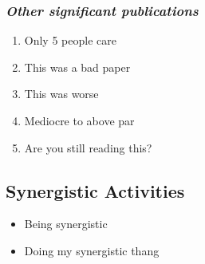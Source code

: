 \subsubsection{\textit{Other significant publications}}
\begin{enumerate}
\item Only 5 people care
\item This was a bad paper
\item This was worse
\item Mediocre to above par
\item Are you still reading this?
\end{enumerate}

\subsection{Synergistic Activities}
\begin{itemize}
\item Being synergistic
\item Doing my synergistic thang
\end{itemize}